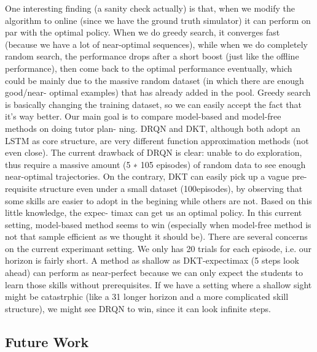 One interesting finding (a sanity check actually) is that, when we modify the algorithm to online (since we have the ground truth simulator) it can perform on par with the optimal policy. When we do greedy search, it converges fast (because we have a lot of near-optimal sequences), while when we do completely random search, the performance drops after a short boost (just like the offline performance), then come back to the optimal performance eventually, which could be mainly due to the massive random dataset (in which there are enough good/near- optimal examples) that has already added in the pool. Greedy search is basically changing the training dataset, so we can easily accept the fact that it’s way better.
Our main goal is to compare model-based and model-free methods on doing tutor plan- ning. DRQN and DKT, although both adopt an LSTM as core structure, are very different function approximation methods (not even close). The current drawback of DRQN is clear: unable to do exploration, thus require a massive amount (5 ∗ 105 episodes) of random data to see enough near-optimal trajectories. On the contrary, DKT can easily pick up a vague pre- requisite structure even under a small dataset (100episodes), by observing that some skills are easier to adopt in the begining while others are not. Based on this little knowledge, the expec- timax can get us an optimal policy. In this current setting, model-based method seems to win (especially when model-free method is not that sample efficient as we thought it should be).
There are several concerns on the current experimant setting. We only has 20 trials for each episode, i.e. our horizon is fairly short. A method as shallow as DKT-expectimax (5 steps look ahead) can perform as near-perfect because we can only expect the students to learn those skills without prerequisites. If we have a setting where a shallow sight might be catastrphic (like a
31
longer horizon and a more complicated skill structure), we might see DRQN to win, since it can look infinite steps.

\subsection{Future Work}

